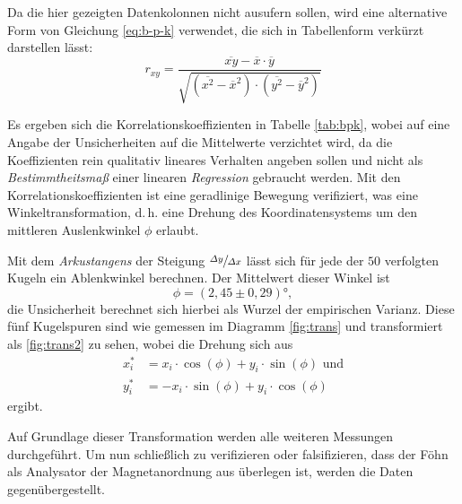 

\noindent Da die hier gezeigten Datenkolonnen nicht ausufern sollen, wird eine alternative Form von Gleichung \eqref{eq:b-p-k} verwendet, die sich in Tabellenform verkürzt darstellen lässt:
\begin{equation}
\label{eq:b-p-k2}
r_{xy} = \frac{\overline{xy}-\overline{x}\cdot \overline{y}}{\sqrt{(\overline{x^2}-\overline{x}^2)\cdot (\overline{y^2}-\overline{y}^2)}}
\end{equation}



\noindent Es ergeben sich die Korrelationskoeffizienten in Tabelle \ref{tab:bpk}, wobei auf eine Angabe der Unsicherheiten auf die Mittelwerte verzichtet wird, da die Koeffizienten rein qualitativ lineares Verhalten angeben sollen und nicht als \textit{Bestimmtheitsmaß} einer linearen \textit{Regression} gebraucht werden. Mit den Korrelationskoeffizienten ist eine geradlinige Bewegung verifiziert, was eine Winkeltransformation, d.\,h. eine Drehung des Koordinatensystems um den mittleren Auslenkwinkel $\phi$ erlaubt.

Mit dem \textit{Arkustangens} der Steigung $\sfrac{\Delta y}{\Delta x}$ lässt sich für jede der $50$ verfolgten Kugeln ein Ablenkwinkel berechnen. Der Mittelwert dieser Winkel ist
\begin{equation}
\label{eq:phi}
\phi = (2,45\pm 0,29)\si{\degree},
\end{equation}
die Unsicherheit berechnet sich hierbei als Wurzel der empirischen Varianz. Diese fünf Kugelspuren sind wie gemessen im Diagramm \ref{fig:trans} und transformiert als \ref{fig:trans2} zu sehen, wobei die Drehung sich aus
\begin{equation}
\begin{alignedat}{2}
x_i^*&=x_i\cdot \cos(\phi)+y_i\cdot \sin(\phi)\text{ und}\\
y_i^*&=-x_i\cdot \sin(\phi)+y_i\cdot \cos(\phi)
\end{alignedat}
\end{equation}
ergibt.




Auf Grundlage dieser Transformation werden alle weiteren Messungen durchgeführt. Um nun schließlich zu verifizieren oder falsifizieren, dass der Föhn als Analysator der Magnetanordnung aus \textcite{Mais2014} überlegen ist, werden die Daten gegenübergestellt.

 

